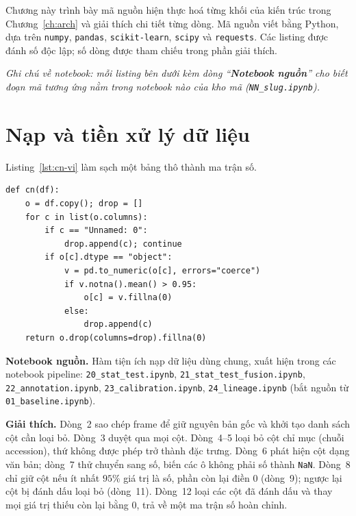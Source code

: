 \documentclass[../main.tex]{subfiles}
\begin{document}
Chương này trình bày mã nguồn hiện thực hoá từng khối của kiến trúc trong Chương~\ref{ch:arch} và giải thích chi tiết từng dòng. Mã nguồn viết bằng Python, dựa trên \texttt{numpy}, \texttt{pandas}, \texttt{scikit-learn}, \texttt{scipy} và \texttt{requests}. Các listing được đánh số độc lập; số dòng được tham chiếu trong phần giải thích.

\begin{center}\small\itshape
Ghi chú về notebook: mỗi listing bên dưới kèm dòng ``\textbf{Notebook nguồn}'' cho biết đoạn mã tương ứng nằm trong notebook nào của kho mã (\texttt{NN\_slug.ipynb}).
\end{center}

\section{Nạp và tiền xử lý dữ liệu}

Listing~\ref{lst:cn-vi} làm sạch một bảng thô thành ma trận số.

\begin{lstlisting}[caption={Ép kiểu số cho một bảng thô.},label=lst:cn-vi]
def cn(df):
    o = df.copy(); drop = []
    for c in list(o.columns):
        if c == "Unnamed: 0":
            drop.append(c); continue
        if o[c].dtype == "object":
            v = pd.to_numeric(o[c], errors="coerce")
            if v.notna().mean() > 0.95:
                o[c] = v.fillna(0)
            else:
                drop.append(c)
    return o.drop(columns=drop).fillna(0)
\end{lstlisting}

\noindent\textbf{Notebook nguồn.} Hàm tiện ích nạp dữ liệu dùng chung, xuất hiện trong các notebook pipeline: \texttt{20\_stat\_test.ipynb}, \texttt{21\_stat\_test\_fusion.ipynb}, \texttt{22\_annotation.ipynb}, \texttt{23\_calibration.ipynb}, \texttt{24\_lineage.ipynb} (bắt nguồn từ \texttt{01\_baseline.ipynb}).

\noindent\textbf{Giải thích.} Dòng~2 sao chép frame để giữ nguyên bản gốc và khởi tạo danh sách cột cần loại bỏ. Dòng~3 duyệt qua mọi cột. Dòng~4--5 loại bỏ cột chỉ mục (chuỗi accession), thứ không được phép trở thành đặc trưng. Dòng~6 phát hiện cột dạng văn bản; dòng~7 thử chuyển sang số, biến các ô không phải số thành \texttt{NaN}. Dòng~8 chỉ giữ cột nếu ít nhất $95\%$ giá trị là số, phần còn lại điền $0$ (dòng~9); ngược lại cột bị đánh dấu loại bỏ (dòng~11). Dòng~12 loại các cột đã đánh dấu và thay mọi giá trị thiếu còn lại bằng $0$, trả về một ma trận số hoàn chỉnh.
\end{document}
